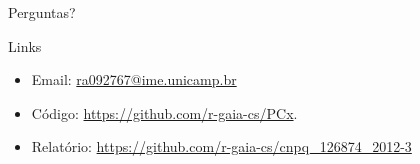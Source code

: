 \documentclass[10pt]{beamer}
\begin{document}
\begin{frame}
  \begin{center}
    Perguntas?
  \end{center}

  \begin{block}{Links}
    \begin{itemize}
      \item Email: \url{ra092767@ime.unicamp.br}
      \item Código: \url{https://github.com/r-gaia-cs/PCx}.
      \item Relatório: \url{https://github.com/r-gaia-cs/cnpq_126874_2012-3}
    \end{itemize}
  \end{block}
\end{frame}
\end{document}
